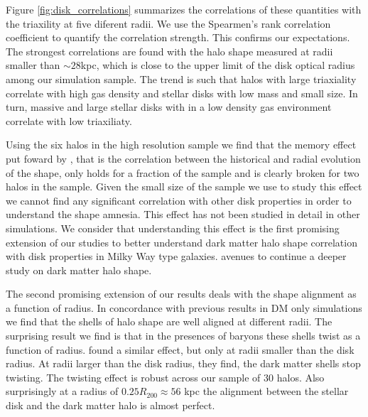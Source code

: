 \documentclass[a4paper,fleqn,usenatbib]{mnras}
\begin{document}
Figure \ref{fig:disk_correlations} summarizes the correlations of
these quantities with the triaxility at five diferent radii.
We use the Spearmen's rank correlation coefficient to quantify the
correlation strength.
This confirms our expectations. The strongest correlations are found
with the halo shape measured at radii smaller than $\sim 28$kpc, which
is close to the upper limit of the disk optical radius among our
simulation sample. 
The trend is such that halos with large triaxiality correlate with
high gas density and stellar disks with low mass and small size.
In turn, massive and large stellar disks with in a low density gas
environment correlate with low triaxiliaty. 


Using the six halos in the high resolution sample we find that the
memory effect put foward by \cite{VeraCiro11}, that is the correlation
between the historical and radial evolution of the shape, only holds
for a fraction of the sample and is clearly broken for two halos in
the sample.
Given the small size of the sample we use to study this effect we
cannot find any significant correlation with other disk properties in
order to understand the shape amnesia. 
This effect has not been studied in detail in other simulations. 
We consider that understanding this effect is the first promising
extension of our studies to better understand dark matter halo shape
correlation with disk properties in Milky Way type galaxies.
avenues to continue a deeper study on dark matter halo shape.

The second promising extension of our results deals with the shape
alignment as a function of radius.
In concordance with previous results in DM only simulations we find
that the shells of halo shape are well aligned at different radii.
The surprising result we find is that in the presences of baryons
these shells twist as a function of radius.
\citep{Debattista08} found a similar effect, but only at radii smaller
than the disk radius. At radii larger than the disk radius, they find,
the dark matter shells stop twisting.
The twisting effect is robust across our sample of 30 halos. 
Also surprisingly at a radius of $0.25R_{200}\approx 56$ kpc the
alignment between the stellar disk and the dark matter halo is almost
perfect. 
\end{document}
